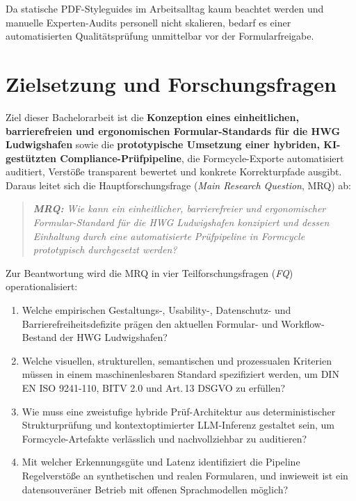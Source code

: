 Da statische PDF-Styleguides im Arbeitsalltag kaum beachtet werden und manuelle Experten-Audits personell nicht skalieren, bedarf es einer automatisierten Qualitätsprüfung unmittelbar vor der Formularfreigabe.

\section{Zielsetzung und Forschungsfragen}
\label{sec:zielsetzung}

Ziel dieser Bachelorarbeit ist die \textbf{Konzeption eines einheitlichen, barrierefreien und ergonomischen Formular-Standards für die HWG Ludwigshafen} sowie die \textbf{prototypische Umsetzung einer hybriden, KI-gestützten Compliance-Prüfpipeline}, die Formcycle-Exporte automatisiert auditiert, Verstöße transparent bewertet und konkrete Korrekturpfade ausgibt. Daraus leitet sich die Hauptforschungsfrage (\textit{Main Research Question}, MRQ) ab:
\begin{quote}
    \textit{\textbf{MRQ:} Wie kann ein einheitlicher, barrierefreier und ergonomischer For\-mu\-lar-Stan\-dard für die HWG Ludwigshafen konzipiert und dessen Einhaltung durch eine automatisierte Prüfpipeline in Formcycle prototypisch durchgesetzt werden?}
\end{quote}

Zur Beantwortung wird die MRQ in vier Teilforschungsfragen (\textit{FQ}) operationalisiert:
\begin{enumerate}
    \item[\textbf{FQ1:}] Welche empirischen Gestaltungs-, Usability-, Datenschutz- und Barrierefreiheitsdefizite prägen den aktuellen Formular- und Workflow-Bestand der HWG Ludwigshafen?
    \item[\textbf{FQ2:}] Welche visuellen, strukturellen, semantischen und prozessualen Kriterien müssen in einem maschinenlesbaren Standard spezifiziert werden, um DIN EN ISO 9241-110, BITV 2.0 und Art.\,13 DSGVO zu erfüllen?
    \item[\textbf{FQ3:}] Wie muss eine zweistufige hybride Prüf-Architektur aus deterministischer Strukturprüfung und kontextoptimierter LLM-Inferenz gestaltet sein, um Formcycle-Artefakte verlässlich und nachvollziehbar zu auditieren?
    \item[\textbf{FQ4:}] Mit welcher Erkennungsgüte und Latenz identifiziert die Pipeline Regelverstöße an synthetischen und realen Formularen, und inwieweit ist ein datensouveräner Betrieb mit offenen Sprachmodellen möglich?
\end{enumerate}

